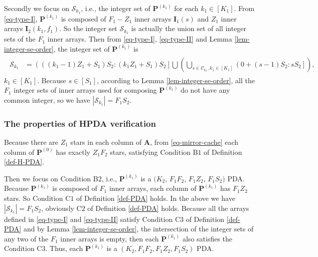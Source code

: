 \documentclass[onecolumn,10pt]{IEEEtran}
\theoremstyle{mythm}
\begin{document}
{Secondly we focus on $\mathcal{S}_{k_1}$, i.e., the integer set of $\mathbf{P}^{(k_1)}$ for each $k_1\in[K_1]$. From \eqref{eq-type-I}, $\mathbf{P}^{(k_1)}$ is composed of $F_1-Z_1$ inner arrays $\mathbf{I}_1(s)$ and $Z_1$ inner arrays $\mathbf{I}_2(k_1,f_1)$. So the integer set $\mathcal{S}_{k_1}$ is actually the union set of all integer sets of the $F_1$ inner arrays. Then from \eqref{eq-type-I}, \eqref{eq-type-II} and Lemma \ref{lem-integer-se-order},  the integer set of $\mathbf{P}^{(k_1)}$ is
\begin{eqnarray}
\label{eq-S-k_1}
\begin{split}
\mathcal{S}_{k_1}&=\left(((k_1-1)Z_1+S_1)S_2:(k_1Z_1+S_1)S_2\right]
\bigcup\left(\bigcup\limits_{s\in \mathcal{C}_{k_1},k_1\in [K_1] }\left(0+(s-1)S_2:sS_2\right]\right),
\end{split}
\end{eqnarray} $k_1\in [K_1]$.  Because $s\in[S_1]$, according to Lemma \ref{lem-integer-se-order}, all the $F_1$ integer sets of inner arrays used for composing $\mathbf{P}^{(k_1)}$ do not have any common integer, so we have $|\mathcal{S}_{k_1}|=F_1S_2$.
\subsubsection{The properties of HPDA verification}
\label{subsub-verify}
Because there are $Z_1$ stars in each column of $\mathbf{A}$, from \eqref{eq-mirror-cache} each column of $\mathbf{P}^{(0)}$ has exactly $Z_1F_2$ stars, satisfying   Condition B$1$ of Definition \ref{def-H-PDA}.


Then we focus on Condition B$2$, i.e.,  $\mathbf{P}^{(k_1)}$ is a $(K_2$, $F_1F_2$, $F_1Z_2$, $ F_1S_2)$ PDA. Because $\mathbf{P}^{(k_1)}$ is composed of $F_1$ inner arrays, each column of $\mathbf{P}^{(k_1)}$ has $F_1Z_2$ stars. So Condition C$1$ of Definition \ref{def-PDA} holds. In the above we have $|\mathcal{S}_{k_1}|=F_1S_2$, obviously C$2$ of Definition \ref{def-PDA} holds.  Because all the arrays defined in \eqref{eq-type-I} and \eqref{eq-type-II} satisfy Condition C$3$ of Definition \ref{def-PDA} and by Lemma \ref{lem-integer-se-order}, the intersection of the integer sets of any two of the $F_1$ inner arrays is empty, then each $\mathbf{P}^{(k_1)}$ also satisfies the Condition C$3$. Thus,  each $\mathbf{P}^{(k_1)}$ is a $(K_2,F_1F_2,F_1Z_2,F_1S_2)$ PDA. %

}
\end{document}
